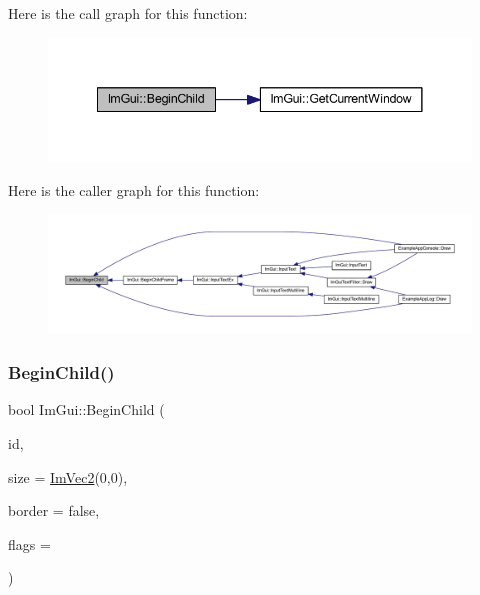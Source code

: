 Here is the call graph for this function\+:
\nopagebreak
\begin{figure}[H]
\begin{center}
\leavevmode
\includegraphics[width=341pt]{namespace_im_gui_a5db08f552118a1f946e19b5933dce181_cgraph}
\end{center}
\end{figure}
Here is the caller graph for this function\+:
\nopagebreak
\begin{figure}[H]
\begin{center}
\leavevmode
\includegraphics[width=350pt]{namespace_im_gui_a5db08f552118a1f946e19b5933dce181_icgraph}
\end{center}
\end{figure}
\mbox{\label{namespace_im_gui_a7001666723434ae00316b8a0160e7de0}} 
\subsubsection{\texorpdfstring{Begin\+Child()}{BeginChild()}\hspace{0.1cm}{\footnotesize\ttfamily [2/2]}}
{\footnotesize\ttfamily bool Im\+Gui\+::\+Begin\+Child (\begin{DoxyParamCaption}\item[{\mbox{\hyperlink{imgui_8h_a1785c9b6f4e16406764a85f32582236f}{Im\+Gui\+ID}}}]{id,  }\item[{const \mbox{\hyperlink{struct_im_vec2}{Im\+Vec2}} \&}]{size = {\ttfamily \mbox{\hyperlink{struct_im_vec2}{Im\+Vec2}}(0,0)},  }\item[{bool}]{border = {\ttfamily false},  }\item[{\mbox{\hyperlink{imgui_8h_a0b8e067ab4f7a818828c8d89e531addc}{Im\+Gui\+Window\+Flags}}}]{flags = {} }\end{DoxyParamCaption})}

